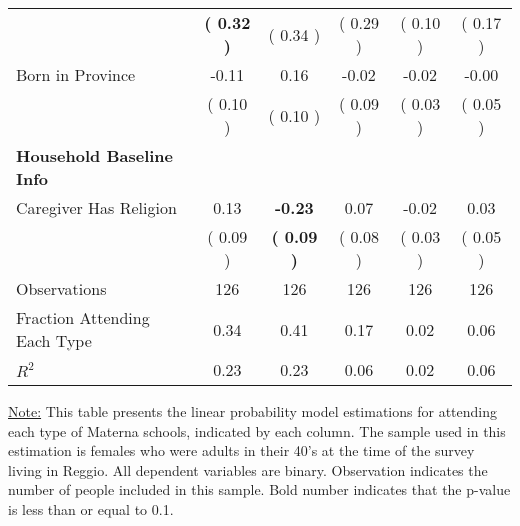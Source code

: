 \begin{table}[H]
{\begin{tabular}{lccccc}
\quad  & \textbf{(     0.32 )} & (     0.34 )  & (     0.29 )  & (     0.10 ) & (     0.17 ) \\
\quad Born in Province &     -0.11 &      0.16 &     -0.02 &     -0.02 &     -0.00 \\
\quad  & (     0.10 ) & (     0.10 )  & (     0.09 )  & (     0.03 ) & (     0.05 ) \\
\midrule
\textbf{Household Baseline Info} \\
\quad Caregiver Has Religion &      0.13 & \textbf{    -0.23} &      0.07 &     -0.02 &      0.03 \\
\quad  & (     0.09 ) & \textbf{(     0.09 )}  & (     0.08 )  & (     0.03 ) & (     0.05 ) \\
\midrule
Observations & 126 & 126 & 126 & 126 & 126 \\
Fraction Attending Each Type &      0.34 &      0.41 &      0.17 &      0.02 &      0.06 \\
\midrule
$ R^2$ &      0.23 &      0.23 &      0.06 &      0.02 &      0.06 \\
\bottomrule
\end{tabular}}
\end{table}
\begin{footnotesize}
\noindent\underline{Note:} This table presents the linear probability model estimations for attending each type of Materna schools, indicated by each column. The sample used in this estimation is females who were adults in their 40's at the time of the survey living in Reggio. All dependent variables are binary. Observation indicates the number of people included in this sample. Bold number indicates that the p-value is less than or equal to 0.1.
\end{footnotesize}
